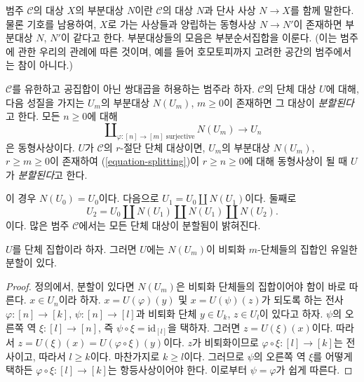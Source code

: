 \noindent
범주 $\mathcal{C}$의 대상 $X$의 부분대상 $N$이란
$\mathcal{C}$의 대상 $N$과 단사 사상 $N \to X$를 함께 말한다.
물론 기호를 남용하여, $X$로 가는 사상들과 양립하는 동형사상
$N \to N'$이 존재하면 부분대상 $N$, $N'$이 같다고 한다.
부분대상들의 모음은 부분순서집합을 이룬다.
(이는 범주에 관한 우리의 관례에 따른 것이며, 예를 들어 호모토피까지
고려한 공간의 범주에서는 참이 아니다.)

\begin{definition}
\label{definition-split}
$\mathcal{C}$를 유한하고 공집합이 아닌 쌍대곱을 허용하는 범주라 하자.
$\mathcal{C}$의 단체 대상 $U$에 대해, 다음 성질을 가지는
$U_m$의 부분대상 $N(U_m)$, $m \geq 0$이 존재하면 그 대상이
{\it 분할된다}고 한다. 모든 $n \geq 0$에 대해
\begin{equation}
\label{equation-splitting}
\coprod\nolimits_{\varphi : [n] \to [m]\text{ surjective}}
N(U_m)
\longrightarrow
U_n
\end{equation}
은 동형사상이다. $U$가 $\mathcal{C}$의 $r$-절단 단체 대상이면,
$U_m$의 부분대상 $N(U_m)$, $r \geq m \geq 0$이 존재하여
(\ref{equation-splitting})이 $r \geq n \geq 0$에 대해 동형사상이 될 때
$U$가 {\it 분할된다}고 한다.
\end{definition}

\noindent
이 경우 $N(U_0) = U_0$이다. 다음으로
$U_1 = U_0 \amalg N(U_1)$이다. 둘째로
$$
U_2 = U_0 \amalg N(U_1) \amalg N(U_1) \amalg N(U_2).
$$
이다. 많은 범주 $\mathcal{C}$에서는 모든 단체 대상이 분할됨이 밝혀진다.

\begin{lemma}
\label{lemma-splitting-simplicial-sets}
$U$를 단체 집합이라 하자. 그러면 $U$에는
$N(U_m)$이 비퇴화 $m$-단체들의 집합인 유일한 분할이 있다.
\end{lemma}

\begin{proof}
정의에서, 분할이 있다면 $N(U_m)$은 비퇴화 단체들의 집합이어야 함이
바로 따른다. $x \in U_n$이라 하자.
$x = U(\varphi)(y)$ 및 $x = U(\psi)(z)$가 되도록 하는 전사
$\varphi : [n] \to [k]$, $\psi : [n] \to [l]$과 비퇴화 단체
$y \in U_k$, $z \in U_l$이 있다고 하자.
$\psi$의 오른쪽 역 $\xi : [l] \to [n]$, 즉
$\psi \circ \xi = \text{id}_{[l]}$을 택하자.
그러면 $z = U(\xi)(x)$이다. 따라서
$z = U(\xi)(x) = U(\varphi \circ \xi)(y)$이다.
$z$가 비퇴화이므로 $\varphi \circ \xi : [l] \to [k]$는 전사이고,
따라서 $l \geq k$이다. 마찬가지로 $k \geq l$이다.
그러므로 $\psi$의 오른쪽 역 $\xi$를 어떻게 택하든
$\varphi \circ \xi : [l] \to [k]$는 항등사상이어야 한다.
이로부터 $\psi = \varphi$가 쉽게 따른다.
\end{proof}

